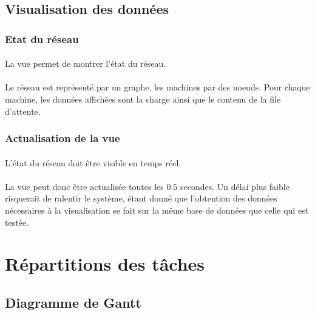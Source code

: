\documentclass[12pt]{article}
\begin{document}
\subsection{Visualisation des données}

\subsubsection{Etat du réseau}

\paragraph{} La vue permet de montrer l'état du réseau.

\paragraph{} Le réseau est représenté par un graphe, les machines par des noeuds. 
Pour chaque machine, les données affichées sont la charge ainsi que le contenu de la file d'attente.

\subsubsection{Actualisation de la vue}

\paragraph{} L'état du réseau doit être visible en temps réel.

\paragraph{} La vue peut donc être actualisée toutes les $0.5$ secondes. 
Un délai plus faible risquerait de ralentir le système, étant donné que l'obtention des données nécessaires à la visualisation se fait sur la même base de données que celle qui est testée.


\newpage
\section{Répartitions des tâches}

\subsection{Diagramme de Gantt}
\end{document}
